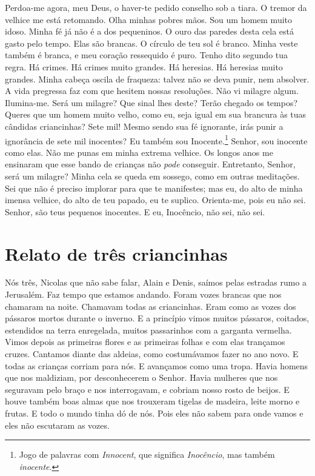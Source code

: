 Perdoa-me agora, meu Deus, o haver-te pedido conselho sob a tiara. O tremor
da velhice me está retomando. Olha minhas pobres mãos. Sou um homem muito
idoso. Minha fé já não é a dos pequeninos. O ouro das paredes desta cela
está gasto pelo tempo. Elas são brancas. O círculo de teu sol é branco.
Minha veste também é branca, e meu coração ressequido é puro. Tenho dito
segundo tua regra. Há crimes. Há crimes muito grandes. Há heresias. Há
heresias muito grandes. Minha cabeça oscila de fraqueza: talvez não se
deva punir, nem absolver. A vida pregressa faz com que hesitem nossas
resoluções. Não vi milagre algum. Ilumina-me. Será um milagre? Que sinal
lhes deste? Terão chegado os tempos? Queres que um homem muito velho, como
eu, seja igual em sua brancura às tuas cândidas criancinhas? Sete mil!
Mesmo sendo sua fé ignorante, irás punir a ignorância de sete mil
inocentes? Eu também sou Inocente.\footnote{ Jogo de
palavras com \textit{Innocent}, que significa \textit{Inocêncio}, mas
também \textit{inocente}.}  Senhor, sou inocente como elas. Não
me punas em minha extrema velhice. Os longos anos me ensinaram que esse
bando de crianças não \textit{pode} conseguir. Entretanto, Senhor, será um
milagre? Minha cela se queda em sossego, como em outras meditações. Sei
que não é preciso implorar para que te manifestes; mas eu, do alto de
minha imensa velhice, do alto de teu papado, eu te suplico. Orienta-me,
pois eu não sei. Senhor, são teus pequenos inocentes. E eu, Inocêncio, não
sei, não sei.

\chapter{Relato de três criancinhas}

Nós três, Nicolas que não sabe falar, Alain e Denis, saímos pelas estradas
rumo a Jerusalém. Faz tempo que estamos andando. Foram vozes brancas que
nos chamaram na noite. Chamavam todas as criancinhas. Eram como as vozes
dos pássaros mortos durante o inverno. E a princípio vimos muitos
pássaros, coitados, estendidos na terra enregelada, muitos passarinhos com
a garganta vermelha. Vimos depois as primeiras flores e as primeiras
folhas e com elas trançamos cruzes. Cantamos diante das aldeias, como
costumávamos fazer no ano novo. E todas as crianças corriam para nós. E
avançamos como uma tropa. Havia homens que nos maldiziam, por
desconhecerem o Senhor. Havia mulheres que nos seguravam pelo braço e nos
interrogavam, e cobriam nosso rosto de beijos. E houve também boas almas
que nos trouxeram tigelas de madeira, leite morno e frutas. E todo o mundo
tinha dó de nós. Pois eles não sabem para onde vamos e eles não escutaram
as vozes.

